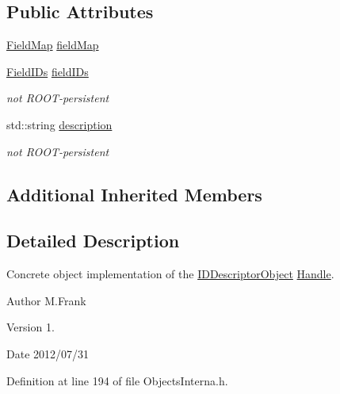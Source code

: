 \subsection*{Public Attributes}
\begin{DoxyCompactItemize}
\item 
\hyperlink{class_d_d4hep_1_1_geometry_1_1_i_d_descriptor_object_a784af03aa08575a914c2399b45eae052}{Field\+Map} \hyperlink{class_d_d4hep_1_1_geometry_1_1_i_d_descriptor_object_a56d35066c16243ed986ee35c789b5a2a}{field\+Map}
\item 
\hyperlink{class_d_d4hep_1_1_geometry_1_1_i_d_descriptor_object_aa9d779170fd1d2221d27f3b63df6d6d4}{Field\+I\+Ds} \hyperlink{class_d_d4hep_1_1_geometry_1_1_i_d_descriptor_object_a5f76652b444d990c08435cf7fdc0e4ea}{field\+I\+Ds}
\begin{DoxyCompactList}\small\item\em not R\+O\+O\+T-\/persistent \end{DoxyCompactList}\item 
std\+::string \hyperlink{class_d_d4hep_1_1_geometry_1_1_i_d_descriptor_object_a2f745060e365a31cb36186dacf26204c}{description}
\begin{DoxyCompactList}\small\item\em not R\+O\+O\+T-\/persistent \end{DoxyCompactList}\end{DoxyCompactItemize}
\subsection*{Additional Inherited Members}


\subsection{Detailed Description}
Concrete object implementation of the \hyperlink{class_d_d4hep_1_1_geometry_1_1_i_d_descriptor_object}{I\+D\+Descriptor\+Object} \hyperlink{class_d_d4hep_1_1_handle}{Handle}. 

\begin{DoxyAuthor}{Author}
M.\+Frank 
\end{DoxyAuthor}
\begin{DoxyVersion}{Version}
1. 
\end{DoxyVersion}
\begin{DoxyDate}{Date}
2012/07/31 
\end{DoxyDate}


Definition at line 194 of file Objects\+Interna.\+h.



